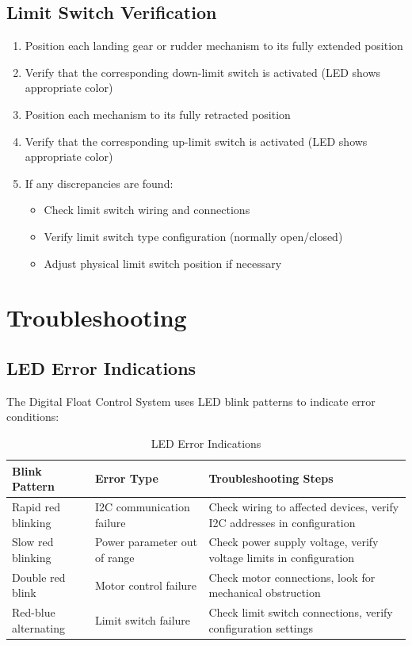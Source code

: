 \documentclass[12pt,a4paper,twoside,openright]{book}
\newcommand{\tabletextfont}{\normalfont\rmfamily}
\newcommand{\tableheadfont}{\normalfont\bfseries}
\begin{document}
\subsection{Limit Switch Verification}

\begin{enumerate}
    \item Position each landing gear or rudder mechanism to its fully extended position
    \item Verify that the corresponding down-limit switch is activated (LED shows appropriate color)
    \item Position each mechanism to its fully retracted position
    \item Verify that the corresponding up-limit switch is activated (LED shows appropriate color)
    \item If any discrepancies are found:
    \begin{itemize}
        \item Check limit switch wiring and connections
        \item Verify limit switch type configuration (normally open/closed)
        \item Adjust physical limit switch position if necessary
    \end{itemize}
\end{enumerate}

\section{Troubleshooting}

\subsection{LED Error Indications}

The Digital Float Control System uses LED blink patterns to indicate error conditions:

\begin{table}[h]
\centering
\setlength{\tabcolsep}{5pt} %
\begin{tabular}{|p{}|p{}|p{}|}
\hline
\tableheadfont\textbf{Blink Pattern} & \tableheadfont\textbf{Error Type} & \tableheadfont\textbf{Troubleshooting Steps} \\
\hline
\tabletextfont Rapid red blinking & I2C communication failure & Check wiring to affected devices, verify I2C addresses in configuration \\
\hline
\tabletextfont Slow red blinking & Power parameter out of range & Check power supply voltage, verify voltage limits in configuration \\
\hline
\tabletextfont Double red blink & Motor control failure & Check motor connections, look for mechanical obstruction \\
\hline
\tabletextfont Red-blue alternating & Limit switch failure & Check limit switch connections, verify configuration settings \\
\hline
\end{tabular}
\caption{LED Error Indications}
\end{table}
\end{document}
